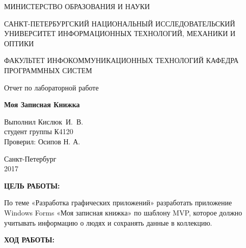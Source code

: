 \documentclass[14pt,a4paper]{extreport}
\begin{document}
	\begin{titlepage}
	\begin{center}	
		\fontsize{14pt}{14pt}\selectfont
		МИНИСТЕРСТВО ОБРАЗОВАНИЯ И НАУКИ\\

		\vspace*{0.6\baselineskip}
		
		САНКТ-ПЕТЕРБУРГСКИЙ НАЦИОНАЛЬНЫЙ ИССЛЕДОВАТЕЛЬСКИЙ УНИВЕРСИТЕТ ИНФОРМАЦИОННЫХ ТЕХНОЛОГИЙ, МЕХАНИКИ И ОПТИКИ
		
		\vspace*{0.6\baselineskip}
		ФАКУЛЬТЕТ ИНФОКОММУНИКАЦИОННЫХ ТЕХНОЛОГИЙ
		КАФЕДРА ПРОГРАММНЫХ СИСТЕМ
	
		\vspace*{7\baselineskip}
		\fontsize{19pt}{18pt}\selectfont
		Отчет по лабораторной работе
		
		\fontsize{20pt}{18pt}\selectfont
		\textbf{Моя Записная Книжка}\\
		\vspace*{1.15\baselineskip}
		\end{center}
	
	\vspace*{2\baselineskip}
	\begin{flushright}
	\fontsize{14pt}{14pt}\selectfont
	Выполнил Кислюк~И.~В.\\
	студент группы К4120\\
	Проверил: Осипов Н. А.\\
	\end{flushright}
	
	\vspace*{3\baselineskip}
	\begin{center}
	Санкт-Петербург\\
	2017
	\end{center}
	
\end{titlepage}

\newpage

\fontsize{16pt}{14pt}\selectfont
\begin{center}
\textbf{ЦЕЛЬ РАБОТЫ:}
\end{center}

По теме «Разработка графических приложений» разработать приложение Windows Forms «Моя записная книжка» по шаблону MVP, которое должно учитывать информацию о людях и сохранять данные в коллекцию.
\clearpage

\begin{center}
\textbf{ХОД РАБОТЫ:}
\end{center}
\end{document}
